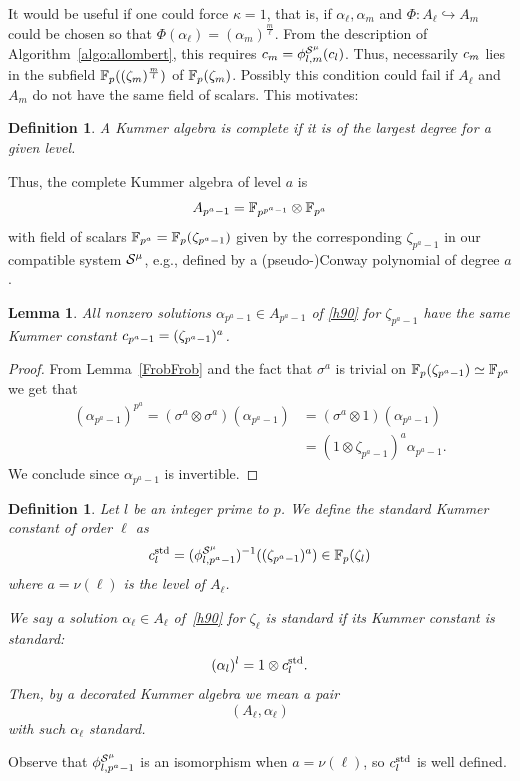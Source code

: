 \documentclass{sig-alternate}
\newtheorem{lemma}[theorem]{Lemma}
\newtheorem{definition}[theorem]{Definition}
\begin{document}
It would be useful if one could force $\kappa=1$, that is, if $\alpha_\ell,\alpha_m$
and $\Phi:A_\ell\hookrightarrow A_m$
could be chosen so that $\Phi(\alpha_\ell)=(\alpha_m)^{\frac{m}{\ell}}$.
From the description of Algorithm~\ref{algo:allombert},
this requires $c_m={\phi^{\mathcal{S}^\mu}_{{l},{m}}}(c_l)$.
Thus,
necessarily $c_m$ lies in the subfield $\mathbb{F}_{p}((\zeta_m)^{\frac{m}{l}})$ of $\mathbb{F}_{p}(\zeta_m)$.
Possibly this condition could fail if $A_\ell$ and $A_m$ do not have the same field of scalars.
This motivates:
\begin{definition}
\label{complete}
A Kummer algebra is \emph{complete} if it is of the largest degree for a given level.
\end{definition}
Thus, the complete Kummer algebra of level $a$ is
\[ A_{p^a-1}=\mathbb{F}_{p^{p^a-1}}\otimes\mathbb{F}_{p^a} \]
with field of scalars $\mathbb{F}_{p^a}=\mathbb{F}_{p}(\zeta_{p^a-1})$ given by the corresponding $\zeta_{p^a-1}$ in our compatible system $\mathcal{S}^\mu$,
e.g., defined by a (pseudo-)Conway polynomial of degree $a$.
\begin{lemma}
\label{Kummer_bizarre}
All nonzero solutions $\alpha_{p^a-1}\in A_{p^a-1}$ of \eqref{h90} for $\zeta_{p^a-1}$
have the same Kummer constant $c_{p^a-1}=(\zeta_{p^a-1})^a$.
\end{lemma}
\begin{proof}
From Lemma~\ref{FrobFrob} and the fact that $\sigma^a$ is trivial on $\mathbb{F}_{p}(\zeta_{p^a-1})\simeq\mathbb{F}_{p^a}$ we get that
\begin{equation*}
\begin{split}
(\alpha_{p^a-1})^{p^a}=(\sigma^a\otimes\sigma^a)(\alpha_{p^a-1})&=(\sigma^a\otimes1)(\alpha_{p^a-1})\\
&=(1\otimes\zeta_{p^a-1})^a\alpha_{p^a-1}.
\end{split}
\end{equation*}
We conclude since $\alpha_{p^a-1}$ is invertible.
\end{proof}
\begin{definition}
\label{alphastandard}
Let $l$ be an integer prime to $p$.
We define the \emph{standard} Kummer constant of order $\ell$ as
\[ c^{\mathrm{std}}_{l}=({\phi^{\mathcal{S}^\mu}_{{l},{p^a-1}}})^{-1}((\zeta_{p^a-1})^a)\in\mathbb{F}_p(\zeta_l) \]
where $a=\nu(\ell)$ is the level of $A_\ell$.

We say a solution $\alpha_\ell\in A_\ell$ of~\eqref{h90} for $\zeta_\ell$ is
\emph{standard} if its Kummer constant is standard:
\[ (\alpha_l)^l=1\otimes c^{\mathrm{std}}_{l}. \]
Then, by a \emph{decorated} Kummer algebra we mean a pair
\[ (A_\ell,\alpha_{\ell}) \]
with such $\alpha_\ell$ standard.
\end{definition}
Observe that ${\phi^{\mathcal{S}^\mu}_{{l},{p^a-1}}}$ is an isomorphism when $a=\nu(\ell)$,
so $c^{\mathrm{std}}_l$ is well defined.
\end{document}
